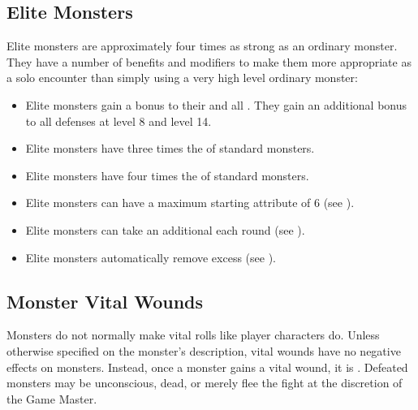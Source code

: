   \subsection{Elite Monsters}\label{Elite Monsters}
    Elite monsters are approximately four times as strong as an ordinary monster.
    They have a number of benefits and modifiers to make them more appropriate as a solo encounter than simply using a very high level ordinary monster:
    \begin{itemize}
      \item Elite monsters gain a  bonus to their  and all . They gain an additional  bonus to all defenses at level 8 and level 14.
      \item Elite monsters have three times the  of standard monsters.
      \item Elite monsters have four times the  of standard monsters.
      \item Elite monsters can have a maximum starting attribute of 6 (see ).
      \item Elite monsters can take an additional  each round (see ).
      \item Elite monsters automatically remove excess  (see ).
    \end{itemize}

  \subsection{Monster Vital Wounds}
    Monsters do not normally make vital rolls like player characters do.
    Unless otherwise specified on the monster's description, vital wounds have no negative effects on monsters.
    Instead, once a monster gains a vital wound, it is .
    Defeated monsters may be unconscious, dead, or merely flee the fight at the discretion of the Game Master.


